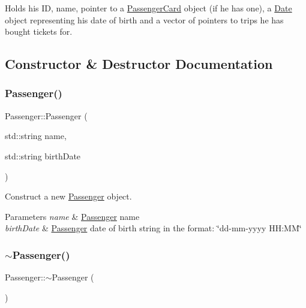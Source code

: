 Holds his ID, name, pointer to a \mbox{\hyperlink{classPassengerCard}{Passenger\+Card}} object (if he has one), a \mbox{\hyperlink{classDate}{Date}} object representing his date of birth and a vector of pointers to trips he has bought tickets for. 

\subsection{Constructor \& Destructor Documentation}
\mbox{\label{classPassenger_a895d7a9cfd358b566ed78e0d81d37bff}} 
\subsubsection{\texorpdfstring{Passenger()}{Passenger()}}
{\footnotesize\ttfamily Passenger\+::\+Passenger (\begin{DoxyParamCaption}\item[{std\+::string}]{name,  }\item[{std\+::string}]{birth\+Date }\end{DoxyParamCaption})}



Construct a new \mbox{\hyperlink{classPassenger}{Passenger}} object. 


\begin{DoxyParams}{Parameters}
{\em name} & \mbox{\hyperlink{classPassenger}{Passenger}} name \\
\hline
{\em birth\+Date} & \mbox{\hyperlink{classPassenger}{Passenger}} date of birth string in the format\+: \char`\"{}dd-\/mm-\/yyyy H\+H\+:\+M\+M\char`\"{} \\
\hline
\end{DoxyParams}
\mbox{\label{classPassenger_a6a6747cafd45d2c85db2ec4e873be3c7}} 
\subsubsection{\texorpdfstring{$\sim$\+Passenger()}{~Passenger()}}
{\footnotesize\ttfamily Passenger\+::$\sim$\+Passenger (\begin{DoxyParamCaption}{ }\end{DoxyParamCaption})}



